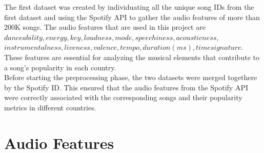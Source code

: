  The first dataset was created by individuating all the unique song IDs from the first dataset and using the Spotify API to gather the audio features of more than 200K songs. The audio features that are used in this project are $danceability, energy, key, loudness, mode, speechiness, acousticness$, 
 $instrumentalness, liveness, valence, tempo, duration (ms), time signature$.  
 These features are essential for analyzing the musical elements that contribute to a song's popularity in each country.\\

 Before starting the preprocessing phase, the two datasets were merged togethere by the Spotify ID. This ensured that the audio features from the Spotify API were 
 correctly associated with the corresponding songs and their popularity metrics in different countries.\\


\newpage
 \section{Audio Features}

